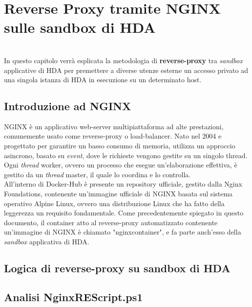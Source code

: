 
\chapter{Reverse Proxy tramite NGINX sulle sandbox di HDA}
\label{cap:nginx-reverse-proxy}
\\
In questo capitolo verrà esplicata la metodologia di \textbf{reverse-proxy} tra \textit{sandbox} applicative di HDA per premettere a diverse utenze esterne un accesso privato ad una singola istanza di HDA in esecuzione su un determinato host.

\section{Introduzione ad NGINX}
NGINX è un applicativo web-server multipiattaforma ad alte prestazioni, comunemente usato come reverse-proxy o load-balancer. Nato nel 2004 e progettato per garantire un basso consumo di memoria, utilizza un approccio asincrono, basato su \textit{event}, dove le richieste vengono gestite su un singolo thread. Ogni \textit{thread} worker, ovvero un processo che esegue un'elaborazione effettiva, è gestito da un \textit{thread} master, il quale lo coordina e lo controlla.\\
All'interno di Docker-Hub è presente un repository ufficiale, gestito dalla Nginx Foundations, contenente un'immagine ufficiale di NGINX basata sul sistema operativo Alpine Linux, ovvero una distribuzione Linux che ha fatto della leggerezza un requisito fondamentale. Come precedentemente spiegato in questo documento, il container atto al reverse-proxy automatizzato contenente un'immagine di NGINX è chiamato "nginxcontainer", e fa parte anch'esso della \textit{sandbox} applicativa di HDA.

\section{Logica di reverse-proxy su sandbox di HDA}

\section{Analisi NginxREScript.ps1}
